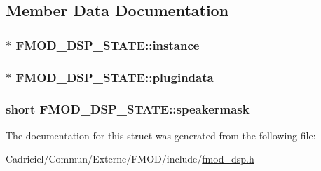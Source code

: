 \subsection{Member Data Documentation}
\hypertarget{struct_f_m_o_d___d_s_p___s_t_a_t_e_a1756ea7b18fdd566e64c64de4151a39c}{
\subsubsection[{instance}]{$\ast$ F\-M\-O\-D\-\_\-\-D\-S\-P\-\_\-\-S\-T\-A\-T\-E\-::instance}}\label{struct_f_m_o_d___d_s_p___s_t_a_t_e_a1756ea7b18fdd566e64c64de4151a39c}
\hypertarget{struct_f_m_o_d___d_s_p___s_t_a_t_e_a94293193f1fd65ffc7d72de31e03932c}{
\subsubsection[{plugindata}]{$\ast$ F\-M\-O\-D\-\_\-\-D\-S\-P\-\_\-\-S\-T\-A\-T\-E\-::plugindata}}\label{struct_f_m_o_d___d_s_p___s_t_a_t_e_a94293193f1fd65ffc7d72de31e03932c}
\hypertarget{struct_f_m_o_d___d_s_p___s_t_a_t_e_a98c7cf116176d358e3d26193245f6e19}{
\subsubsection[{speakermask}]{ short F\-M\-O\-D\-\_\-\-D\-S\-P\-\_\-\-S\-T\-A\-T\-E\-::speakermask}}\label{struct_f_m_o_d___d_s_p___s_t_a_t_e_a98c7cf116176d358e3d26193245f6e19}


The documentation for this struct was generated from the following file\-:\begin{DoxyCompactItemize}
\item 
Cadriciel/\-Commun/\-Externe/\-F\-M\-O\-D/include/\hyperlink{fmod__dsp_8h}{fmod\-\_\-dsp.\-h}\end{DoxyCompactItemize}
